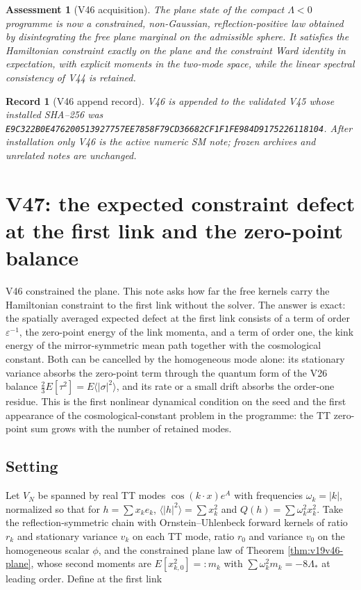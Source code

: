 \documentclass[11pt]{article}
\newtheorem{assessment}[theorem]{Assessment}
\newtheorem{record}[theorem]{Record}
\theoremstyle{remark}
\begin{document}
\begin{assessment}[V46 acquisition]
\label{ass:v19v46}
The plane state of the compact \(\Lambda<0\) programme is now a
constrained, non-Gaussian, reflection-positive law obtained by
disintegrating the free plane marginal on the admissible sphere.  It
satisfies the Hamiltonian constraint exactly on the plane and the
constraint Ward identity in expectation, with explicit moments in the
two-mode space, while the linear spectral consistency of V44 is
retained.
\end{assessment}

\begin{record}[V46 append record]
\label{rec:v19v46}
V46 is appended to the validated V45 whose installed SHA--256 was
\texttt{E9C322B0E476200513927757EE7858F79CD36682CF1F1FE984D9175226118104}.
After installation only V46 is the active numeric SM note; frozen
archives and unrelated notes are unchanged.
\end{record}


\section{V47: the expected constraint defect at the first link and the zero-point balance}
\label{sec:v19v47}

V46 constrained the plane.  This note asks how far the free kernels
carry the Hamiltonian constraint to the first link without the solver.
The answer is exact: the spatially averaged expected defect at the
first link consists of a term of order \(\varepsilon^{-1}\), the
zero-point energy of the link momenta, and a term of order one, the
kink energy of the mirror-symmetric mean path together with the
cosmological constant.  Both can be cancelled by the homogeneous mode
alone: its stationary variance absorbs the zero-point term through the
quantum form of the V26 balance \(\tfrac23E[\tau^2]=E\langle|\sigma|^2\rangle\),
and its rate or a small drift absorbs the order-one residue.  This is
the first nonlinear dynamical condition on the seed and the first
appearance of the cosmological-constant problem in the programme: the
TT zero-point sum grows with the number of retained modes.

\subsection{Setting}

Let \(V_N\) be spanned by real TT modes \(\cos(k\cdot x)e^A\) with
frequencies \(\omega_k=|k|\), normalized so that for
\(h=\sum x_ke_k\), \(\langle|h|^2\rangle=\sum x_k^2\) and
\(Q(h)=\sum\omega_k^2x_k^2\).  Take the reflection-symmetric chain with
Ornstein--Uhlenbeck forward kernels of ratio \(r_k\) and stationary
variance \(v_k\) on each TT mode, ratio \(r_0\) and variance \(v_0\) on
the homogeneous scalar \(\phi\), and the constrained plane law of
Theorem \ref{thm:v19v46-plane}, whose second moments are
\(E[x_{k,0}^2]=:m_k\) with \(\sum\omega_k^2m_k=-8\Lambda_*\) at leading
order.  Define at the first link
\end{document}
